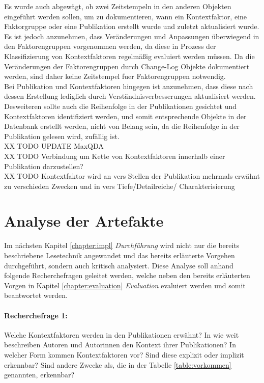 Es wurde auch abgewägt, ob zwei Zeitstempeln in den anderen Objekten eingeführt werden sollen, um zu dokumentieren, wann ein Kontextfaktor, eine Faktorgruppe oder eine Publikation erstellt wurde und zuletzt aktualisiert wurde. \\
Es ist jedoch anzunehmen, dass Veränderungen und Anpassungen überwiegend in den Faktorengruppen vorgenommen werden, da diese in Prozess der Klassifizierung von Kontextfaktoren regelmäßig evaluiert werden müssen. Da die Veränderungen der Faktorengruppen durch Change-Log Objekte dokumentiert werden, sind daher keine Zeitstempel fuer Faktorengruppen notwendig.\\
Bei Publikation und Kontextfaktoren hingegen ist anzunehmen, dass diese nach dessen Erstellung lediglich durch Verständnisverbesserungen aktualisiert werden.  \\
Desweiteren sollte auch die Reihenfolge in der Publikationen gesichtet und Kontextfaktoren identifiziert werden, und somit entsprechende Objekte in der Datenbank erstellt werden, nicht von Belang sein, da die Reihenfolge in der Publikation gelesen wird, zufällig ist.\\

XX TODO UPDATE MaxQDA \\
XX TODO Verbindung um Kette von Kontextfaktoren innerhalb einer Publikation darzustellen? \\
XX TODO Kontextfaktor wird an vers Stellen der Publikation mehrmals erwähnt zu verschieden Zwecken und in vers Tiefe/Detailreiche/ Charakterisierung \\


\section{Analyse der Artefakte}
\label{sec:analysis-step}
Im nächsten Kapitel \ref{chapter:impl} \textit{Durchführung} wird nicht nur die bereits beschriebene Lesetechnik angewandet und das bereits erläuterte Vorgehen durchgeführt, sondern auch kritisch analysiert. Diese Analyse soll anhand folgende Recherchefragen geleitet werden, welche neben den bereits erläuterten Vorgen in Kapitel \ref{chapter:evaluation} \textit{Evaluation} evaluiert werden und somit beantwortet werden. \\

\paragraph{Recherchefrage 1:} Welche Kontextfaktoren werden in den Publikationen erwähnt? In wie weit beschreiben Autoren und Autorinnen den Kontext ihrer Publikationen? In welcher Form kommen Kontextfaktoren vor? Sind diese explizit oder implizit erkennbar? Sind andere Zwecke als, die in der Tabelle \ref{table:vorkommen} genannten, erkennbar? 

